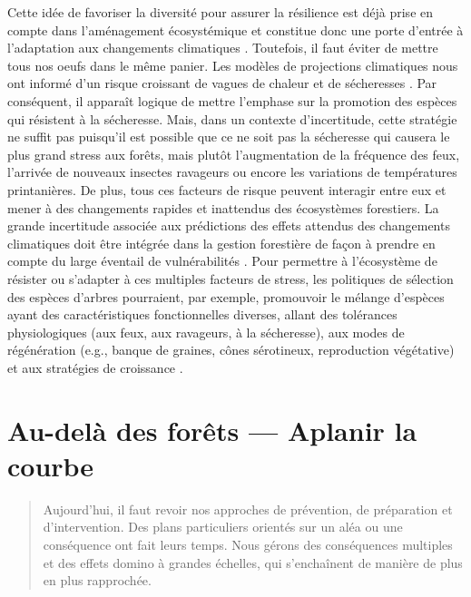 Cette idée de favoriser la diversité pour assurer la résilience est déjà
prise en compte dans l'aménagement écosystémique et constitue donc une
porte d'entrée à l'adaptation aux changements climatiques
\citep{samuel_foret_2011}. Toutefois, il faut éviter de mettre tous nos
oeufs dans le même panier. Les modèles de projections climatiques nous
ont informé d'un risque croissant de vagues de chaleur et de sécheresses
\citep{ipcc_climate_2014}. Par conséquent, il apparaît logique de mettre
l'emphase sur la promotion des espèces qui résistent à la sécheresse.
Mais, dans un contexte d'incertitude, cette stratégie ne suffit pas
puisqu'il est possible que ce ne soit pas la sécheresse qui causera le
plus grand stress aux forêts, mais plutôt l'augmentation de la fréquence
des feux, l'arrivée de nouveaux insectes ravageurs ou encore les
variations de températures printanières. De plus, tous ces facteurs de
risque peuvent interagir entre eux et mener à des changements rapides et
inattendus des écosystèmes forestiers. La grande incertitude associée
aux prédictions des effets attendus des changements climatiques doit
être intégrée dans la gestion forestière de façon à prendre en compte du
large éventail de vulnérabilités \citep{messier_dealing_2016}. Pour
permettre à l'écosystème de résister ou s'adapter à ces multiples
facteurs de stress, les politiques de sélection des espèces d'arbres
pourraient, par exemple, promouvoir le mélange d'espèces ayant des
caractéristiques fonctionnelles diverses, allant des tolérances
physiologiques (aux feux, aux ravageurs, à la sécheresse), aux modes de
régénération (e.g., banque de graines, cônes sérotineux, reproduction
végétative) et aux stratégies de croissance
\citep{messier_functional_2019, puettmann_critique_2009}.

\hypertarget{au-deluxe0-des-foruxeats-aplanir-la-courbe}{%
\section{Au-delà des forêts --- Aplanir la
courbe}\label{au-deluxe0-des-foruxeats-aplanir-la-courbe}}

\begin{quote}
Aujourd'hui, il faut revoir nos approches de prévention, de préparation
et d'intervention. Des plans particuliers orientés sur un aléa ou une
conséquence ont fait leurs temps. Nous gérons des conséquences multiples
et des effets domino à grandes échelles, qui s'enchaînent de manière de
plus en plus rapprochée.
\end{quote}

